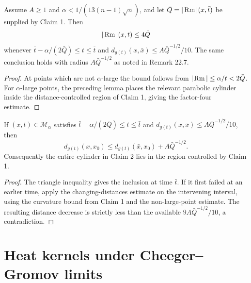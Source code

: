 \begin{claim}
\label{clm:chow-iii-point-picking-claim-two}
Assume \(A\ge1\) and \(\alpha<1/(13(n-1)\sqrt n)\), and let
\(\bar Q=|\operatorname{Rm}|(\bar x,\bar t)\) be supplied by Claim 1.  Then
\[
 |\operatorname{Rm}|(x,t)\le4\bar Q
\]
whenever \(\bar t-\alpha/(2\bar Q)\le t\le\bar t\) and
\(d_{g(t)}(x,\bar x)\le A\bar Q^{-1/2}/10\).  The same conclusion holds
with radius \(A\bar Q^{-1/2}\) as noted in Remark 22.7.
\end{claim}
\begin{proof}
At points which are not \(\alpha\)-large the bound follows from
\(|\operatorname{Rm}|\le\alpha/t<2\bar Q\).  For \(\alpha\)-large points, the preceding
lemma places the relevant parabolic cylinder inside the distance-controlled
region of Claim 1, giving the factor-four estimate.
\end{proof}

\begin{lemma}
\label{lem:chow-iii-point-picking-local-cylinder}
If \((x,t)\in\mathcal M_\alpha\) satisfies
\(\bar t-\alpha/(2\bar Q)\le t\le\bar t\) and
\(d_{g(t)}(x,\bar x)\le A\bar Q^{-1/2}/10\), then
\[
 d_{g(t)}(x,x_0)\le d_{g(t)}(\bar x,x_0)+A\bar Q^{-1/2}.
\]
Consequently the entire cylinder in Claim 2 lies in the region controlled by
Claim 1.
\end{lemma}
\begin{proof}
The triangle inequality gives the inclusion at time \(\bar t\).  If it first
failed at an earlier time, apply the changing-distances estimate on the
intervening interval, using the curvature bound from Claim 1 and the
non-large-point estimate.  The resulting distance decrease is strictly less
than the available \(9A\bar Q^{-1/2}/10\), a contradiction.
\end{proof}

\section{Heat kernels under Cheeger--Gromov limits}

